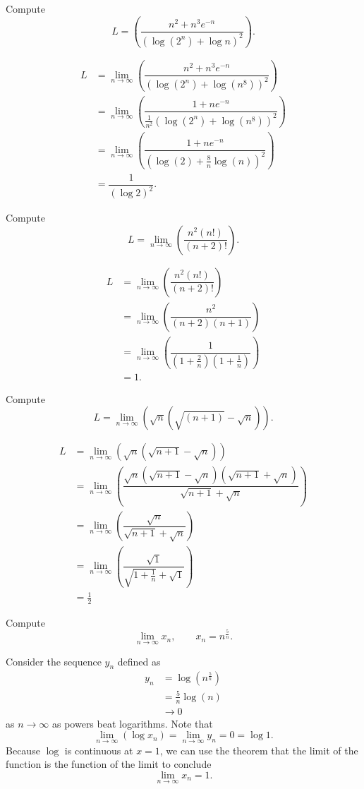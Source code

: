 \begin{example}
    Compute \[L=\left(\dfrac{n^2+n^3e^{-n}}{(\log(2^n)+\log n)^2}\right).\]
    
    \begin{align*}
        L&=\lim_{n\to\infty}\left(\dfrac{n^2+n^3e^{-n}}{(\log(2^n)+\log(n^8))^2}\right)\\
        &=\lim_{n\to\infty}\left(\dfrac{1+ne^{-n}}{\frac1{n^2}(\log(2^n)+\log(n^8))^2}\right)\tag{By COLT}\\
        &=\lim_{n\to\infty}\left(\dfrac{1+ne^{-n}}{(\log(2)+\frac8n\log(n))^2}\right)\\
        &=\dfrac{1}{(\log{2})^2}.
    \end{align*}
\end{example}

\begin{example}
    Compute \[L=\lim_{n\to\infty}\left(\dfrac{n^2(n!)}{(n+2)!}\right).\]
    
    \begin{align*}
        L&=\lim_{n\to\infty}\left(\dfrac{n^2(n!)}{(n+2)!}\right)\\
        &=\lim_{n\to\infty}\left(\dfrac{n^2}{(n+2)(n+1)}\right)\\
        &=\lim_{n\to\infty}\left(\dfrac{1}{(1+\frac2n)(1+\frac1n)}\right)\tag{By COLT}\\
        &=1.
    \end{align*}
\end{example}

\begin{example}
    Compute \[L=\lim_{n\to\infty}\left(\sqrt{n}\left(\sqrt{(n+1)}-\sqrt{n}\right)\right).\]
    
    \begin{align*}
        L&=\lim_{n\to\infty}\left(\sqrt{n}\left(\sqrt{n+1}-\sqrt{n}\right)\right)\\
        &=\lim_{n\to\infty}\left(\dfrac{\sqrt{n}(\sqrt{n+1}-\sqrt{n})(\sqrt{n+1}+\sqrt{n})}{\sqrt{n+1}+\sqrt{n}}\right)\\
        &=\lim_{n\to\infty}\left(\dfrac{\sqrt{n}}{\sqrt{n+1}+\sqrt{n}}\right)\\
        &=\lim_{n\to\infty}\left(\dfrac{\sqrt{1}}{\sqrt{1+\frac1n}+\sqrt{1}}\right)\tag{By COLT}\\
        &=\frac12
    \end{align*}
\end{example}

\begin{example}
    Compute \[\lim_{n\to\infty}x_n,\qquad x_n=n^{\frac5n}.\]
    
    Consider the sequence $y_n$ defined as 
    \begin{align*}
        y_n&=\log(n^{\frac5n})\\
        &=\frac5n\log(n)\\
        &\to0
    \end{align*}
    as $n\to\infty$ as powers beat logarithms. Note that \[\lim_{n\to\infty}(\log x_n)=\lim_{n\to\infty}y_n=0=\log1.\] Because $\log$ is continuous at $x=1$, we can use the theorem that the limit of the function is the function of the limit to conclude \[\lim_{n\to\infty}x_n=1.\]
\end{example}

